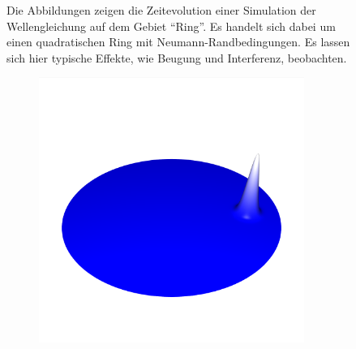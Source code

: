 \documentclass[crop=false,10pt,ngerman]{standalone}
\begin{document}
\begin{figure}[h]
\begin{subfigure}[b]{0.24\textwidth}
          \caption{}
        \end{subfigure}
        \caption[Wellensimulation auf einem quadratischen Ring]{%
          Die Abbildungen zeigen die Zeitevolution einer Simulation der Wellengleichung auf dem Gebiet \enquote{Ring}.
          Es handelt sich dabei um einen quadratischen Ring mit Neumann-Randbedingungen.
          Es lassen sich hier typische Effekte, wie Beugung und Interferenz, beobachten.
        }
        \label{fig:ring-wave}
      \end{figure}

      \begin{figure}[h]
        \center
        \begin{subfigure}[b]{0.24\textwidth}
          \center
          \includegraphics[trim={1.5cm 3.05cm 1.5cm 5.2cm},clip,width=0.95\textwidth]{images/circle_wave_0.png}
          \caption{}
        \end{subfigure}
        \begin{subfigure}[b]{0.24\textwidth}
          \center

\end{subfigure}
\end{figure}
\end{document}
